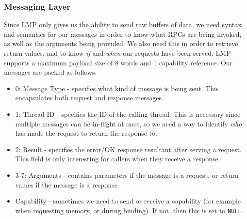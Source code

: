\subsubsection{Messaging Layer}
Since LMP only gives us the ability to send raw buffers of data, we need syntax and semantics for our messages in order to know what RPCs are being invoked, as well as the arguments being provided. We also need this in order to retrieve return values, and to know \textit{if} and \textit{when} our requests have been served. LMP supports a maximum payload size of 8 words and 1 capability reference. Our messages are packed as follows:
\begin{itemize}[itemsep=0pt]
    \item 0: Message Type - specifies what kind of message is being sent. This encapsulates both request and response messages.
    \item 1: Thread ID - specifies the ID of the calling thread. This is necessary since multiple messages can be in-flight at once, so we need a way to identify \textit{who} has made the request to return the response to.
    \item 2: Result - specifies the error/OK response resultant after serving a request. This field is only interesting for callers when they receive a response.
    \item 3-7: Arguments - contains parameters if the message is a request, or return values if the message is a response.
    \item Capability - sometimes we need to send or receive a capability (for example when requesting memory, or during binding). If not, then this is set to \texttt{NULL}.
\end{itemize}

